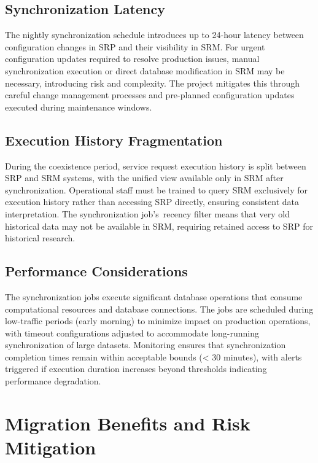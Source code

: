 \subsection{Synchronization Latency}

The nightly synchronization schedule introduces up to 24-hour latency between configuration changes in SRP and their visibility in SRM. For urgent configuration updates required to resolve production issues, manual synchronization execution or direct database modification in SRM may be necessary, introducing risk and complexity. The project mitigates this through careful change management processes and pre-planned configuration updates executed during maintenance windows.

\subsection{Execution History Fragmentation}

During the coexistence period, service request execution history is split between SRP and SRM systems, with the unified view available only in SRM after synchronization. Operational staff must be trained to query SRM exclusively for execution history rather than accessing SRP directly, ensuring consistent data interpretation. The synchronization job's~recency filter means that very old historical data may not be available in SRM, requiring retained access to SRP for historical research.

\subsection{Performance Considerations}

The synchronization jobs execute significant database operations that consume computational resources and database connections. The jobs are scheduled during low-traffic periods (early morning) to minimize impact on production operations, with timeout configurations adjusted to accommodate long-running synchronization of large datasets. Monitoring ensures that synchronization completion times remain within acceptable bounds (< 30 minutes), with alerts triggered if execution duration increases beyond thresholds indicating performance degradation.

\section{Migration Benefits and Risk Mitigation}

